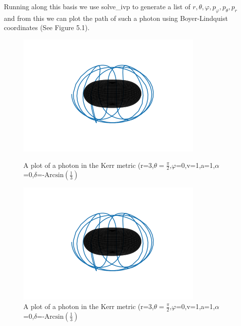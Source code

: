 \documentclass[oneside,openright,frontopenright]{dmathesis}
\begin{document}
	Running along this basis we use solve\_ivp to generate a list of $r,\theta,\varphi,p_{\varphi},p_{\theta},p_{r}$ and from this we can plot the path of such a photon using Boyer-Lindquist coordinates (See Figure 5.1).

\begin{figure}
	\centering
	\begin{minipage}{0.5\textwidth}
		\centering
		\includegraphics[width=0.8\linewidth]{img/3d-kerr-plot}
		\caption{A plot of a photon in the Kerr metric (r=3,$\theta=\frac{\pi}{2}$,$\varphi$=0,v=1,a=1,$\alpha$=0,$\delta$=-$\mbox{Arcsin}(\frac{1}{3})$}
	\end{minipage}%
	\begin{minipage}{0.5\textwidth}
		\centering
		\includegraphics[width=0.8\linewidth]{img/3d-kerr-plot}
		\caption{A plot of a photon in the Kerr metric (r=3,$\theta=\frac{\pi}{2}$,$\varphi$=0,v=1,a=1,$\alpha$=0,$\delta$=-$\mbox{Arcsin}(\frac{1}{3})$}
	\end{minipage}
\end{figure}



\appendix
%
%


{}
\end{document}
